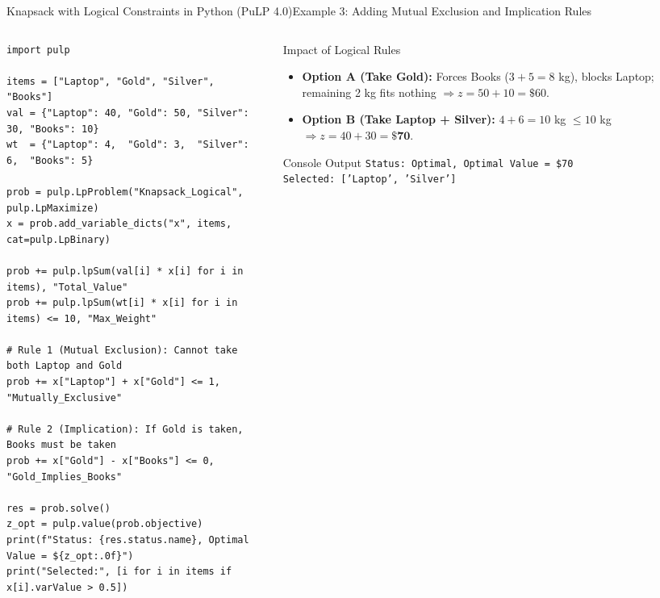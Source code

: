 \documentclass[aspectratio=169]{beamer}
\begin{document}
\begin{frame}[fragile]{Knapsack with Logical Constraints in Python (PuLP 4.0)}{Example 3: Adding Mutual Exclusion and Implication Rules}
\begin{columns}[T]
\begin{column}{0.58\textwidth}
\begin{lstlisting}
import pulp

items = ["Laptop", "Gold", "Silver", "Books"]
val = {"Laptop": 40, "Gold": 50, "Silver": 30, "Books": 10}
wt  = {"Laptop": 4,  "Gold": 3,  "Silver": 6,  "Books": 5}

prob = pulp.LpProblem("Knapsack_Logical", pulp.LpMaximize)
x = prob.add_variable_dicts("x", items, cat=pulp.LpBinary)

prob += pulp.lpSum(val[i] * x[i] for i in items), "Total_Value"
prob += pulp.lpSum(wt[i] * x[i] for i in items) <= 10, "Max_Weight"

# Rule 1 (Mutual Exclusion): Cannot take both Laptop and Gold
prob += x["Laptop"] + x["Gold"] <= 1, "Mutually_Exclusive"

# Rule 2 (Implication): If Gold is taken, Books must be taken
prob += x["Gold"] - x["Books"] <= 0, "Gold_Implies_Books"

res = prob.solve()
z_opt = pulp.value(prob.objective)
print(f"Status: {res.status.name}, Optimal Value = ${z_opt:.0f}")
print("Selected:", [i for i in items if x[i].varValue > 0.5])
\end{lstlisting}
\end{column}
\begin{column}{0.39\textwidth}
\begin{block}{Impact of Logical Rules}
\footnotesize
\begin{itemize}
  \item \textbf{Option A (Take Gold):} Forces Books ($3+5=8$ kg), blocks Laptop; remaining 2 kg fits nothing $\Rightarrow z = 50 + 10 = \$60$.
  \item \textbf{Option B (Take Laptop + Silver):} $4+6=10$ kg $\le 10$ kg $\Rightarrow z = 40 + 30 = \mathbf{\$70}$.
\end{itemize}
\end{block}
\begin{alertblock}{Console Output}
\scriptsize
\texttt{Status: Optimal, Optimal Value = \$70}\\
\texttt{Selected: ['Laptop', 'Silver']}
\end{alertblock}
\end{column}
\end{columns}
\end{frame}
\end{document}
